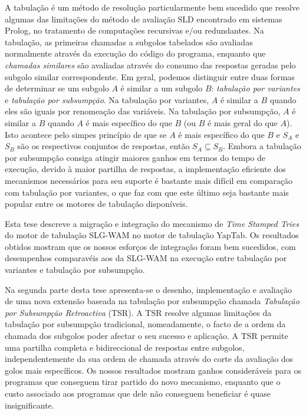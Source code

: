 A tabulação é um método de resolução particularmente bem sucedido que resolve algumas das limitações
do método de avaliação SLD encontrado em sistemas Prolog, no tratamento de computações recursivas e/ou redundantes.
Na tabulação, as primeiras chamadas a subgolos tabelados são avaliadas normalmente através da execução do código do
programa, enquanto que \emph{chamadas similares} são avaliadas através do consumo das respostas geradas
pelo subgolo similar correspondente.
Em geral, podemos distinguir entre duas formas de determinar se um subgolo $A$ é similar a um subgolo $B$:
\emph{tabulação por variantes} e \emph{tabulação por subsumpção}.
Na tabulação por variantes, $A$ é similar a $B$ quando eles são iguais por renomeação das variáveis.
Na tabulação por subsumpção, $A$ é similar a $B$ quando $A$ é mais específico do que $B$ (ou $B$ é mais geral do que $A$).
Isto acontece pelo simpes princípio de que se $A$ é mais específico do que $B$ e $S_A$ e $S_B$ são os respectivos
conjuntos de respostas, então $S_A \subseteq S_B$.
Embora a tabulação por subsumpção consiga atingir maiores ganhos em termos do tempo de execução, devido
à maior partilha de respostas, a implementação eficiente dos mecanismos necessários para seu suporte é bastante
mais difícil em comparação com tabulação por variantes, o que faz com que este último seja bastante mais popular
entre os motores de tabulação disponíveis.

Esta tese descreve a migração e integração do mecanismo de \emph{Time Stamped Tries} do motor de tabulação
SLG-WAM no motor de tabulação YapTab. Os resultados obtidos mostram que os nossos esforços de integração foram
bem sucedidos, com desempenhos comparavéis aos da SLG-WAM na execução entre tabulação por variantes e tabulação
por subsumpção.

Na segunda parte desta tese apresenta-se o desenho, implementação e avaliação de uma nova extensão baseada na tabulação
por subsumpção chamada \emph{Tabulação por Subsumpção Retroactiva} (TSR). A TSR resolve algumas limitações da
tabulação por subsumpção tradicional, nomeadamente, o facto de a ordem da chamada dos subgolos poder afectar o seu sucesso e
aplicação. A TSR permite uma partilha completa e bidireccional de respostas entre subgolos, independentemente da
sua ordem de chamada através do corte da avaliação dos golos mais específicos.
Os nossos resultados mostram ganhos consideráveis para os programas que conseguem tirar partido do novo mecanismo,
enquanto que o custo associado aos programas que dele não conseguem beneficiar é quase insignificante.
